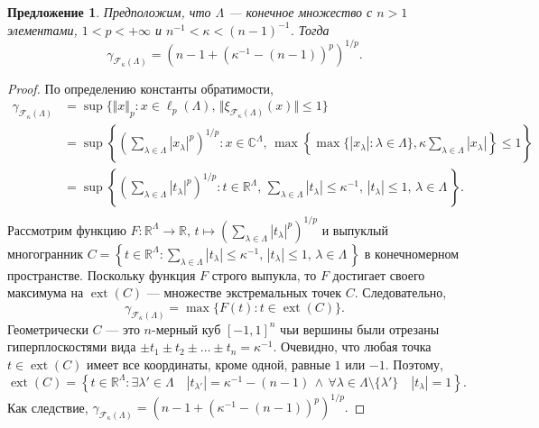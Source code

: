 \documentclass[12pt]{article}
\newtheorem{proposition}[theorem]{Предложение}
\begin{document}
\begin{proposition}\label{StdEmbdSpclCoerciv}
    Предположим, что $\Lambda$ --- конечное множество с $n>1$ 
    элементами, $1<p<+\infty$ и $n^{-1}<\kappa<(n-1)^{-1}$. Тогда
    \[
        \gamma_{\mathcal{F}_{\kappa}(\Lambda)}
        =(n-1+(\kappa^{-1}-(n-1))^p)^{1/p}.
    \]
\end{proposition}
\begin{proof}
    По определению константы обратимости,
    \[
    \begin{aligned}
        \gamma_{\mathcal{F}_{\kappa}(\Lambda)}
        &=\sup\{
            \Vert x\Vert_p : 
            x\in\ell_p(\Lambda),\, 
            \Vert \xi_{\mathcal{F}_{\kappa}(\Lambda)}(x)\Vert\leq 1
        \} \\
        &=\sup\left\{
            \left( \sum_{\lambda\in\Lambda} |x_\lambda|^p\right)^{1/p} : 
            x\in\mathbb{C}^\Lambda,\, 
            \max\left\{
                \max\{|x_\lambda|:\lambda\in\Lambda\},
                \kappa\sum_{\lambda\in\Lambda} |x_\lambda|
            \right\}\leq 1
        \right\} \\
        &=\sup\left\{
            \left( \sum_{\lambda\in\Lambda} |t_\lambda|^p\right)^{1/p} : 
            t\in\mathbb{R}^\Lambda,\, 
            \sum_{\lambda\in\Lambda} |t_\lambda|\leq \kappa^{-1},\,
            |t_\lambda|\leq 1,\,\lambda\in\Lambda\,
        \right\}. \\
    \end{aligned}
    \]
    Рассмотрим функцию
    $
        F:
        \mathbb{R}^\Lambda\to\mathbb{R},\, 
        t\mapsto \left(\sum_{\lambda\in\Lambda}|t_\lambda|^p\right)^{1/p}
    $
    и выпуклый многогранник
    $
        C=\left\{ 
            t\in\mathbb{R}^\Lambda : 
            \sum_{\lambda\in\Lambda} |t_\lambda|\leq \kappa^{-1},\,
            |t_\lambda|\leq 1,\,\lambda\in\Lambda\,
        \right\}
    $
    в конечномерном пространстве. Поскольку функция $F$ строго выпукла, то $F$ 
    достигает своего максимума на $\operatorname{ext}(C)$ --- множестве 
    экстремальных точек $C$. Следовательно,
    \[
        \gamma_{\mathcal{F}_{\kappa}(\Lambda)}=\max\{
            F(t):t\in\operatorname{ext}(C)
        \}.
    \]
    Геометрически $C$ --- это $n$-мерный куб $[-1,1]^n$ чьи вершины были 
    отрезаны гиперплоскостями вида $\pm t_1\pm t_2\pm\ldots\pm t_n=\kappa^{-1}$.
    Очевидно, что любая точка $t\in \operatorname{ext}(C)$ имеет все координаты, 
    кроме одной, равные $1$ или $-1$. Поэтому,
    \[
        \operatorname{ext}(C)=\left\{ 
            t\in\mathbb{R}^\Lambda : 
            \exists \lambda'\in\Lambda\quad |t_{\lambda'}|=\kappa^{-1}-(n-1)\,
            \wedge\, 
            \forall \lambda\in\Lambda\setminus\{\lambda'\}\quad |t_\lambda|=1
        \right\}.
    \]
    Как следствие,
    $
        \gamma_{\mathcal{F}_{\kappa}(\Lambda)}=(n-1+(\kappa^{-1}-(n-1))^p)^{1/p}.
    $
\end{proof}
\end{document}
